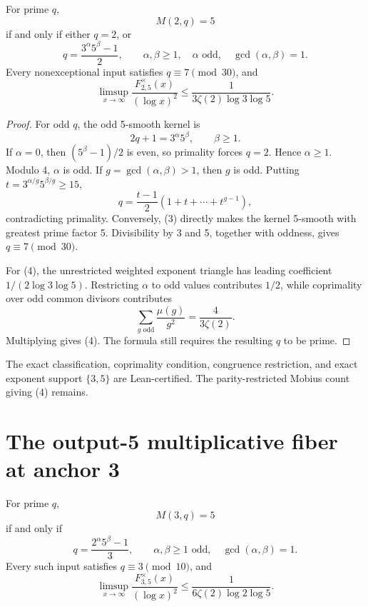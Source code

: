 \documentclass[10pt,a4paper]{scrartcl}
\begin{document}
For prime $q$,
\[
M(2,q)=5
\]
if and only if either $q=2$, or
\begin{equation}
q=\frac{3^\alpha5^\beta-1}{2},\qquad \alpha,\beta\ge1,\quad \alpha\text{ odd},\quad \gcd(\alpha,\beta)=1. \tag{3}
\end{equation}
Every nonexceptional input satisfies $q\equiv7\pmod{30}$, and
\begin{equation}
\limsup_{x\to\infty}\frac{F^\times_{2,5}(x)}{(\log x)^2}
\le\frac1{3\zeta(2)\log3\log5}. \tag{4}
\end{equation}

\begin{proof}
For odd $q$, the odd 5-smooth kernel is
\[
2q+1=3^\alpha5^\beta,\qquad \beta\ge1.
\]
If $\alpha=0$, then $(5^\beta-1)/2$ is even, so primality forces $q=2$. Hence $\alpha\ge1$. Modulo 4, $\alpha$ is odd. If $g=\gcd(\alpha,\beta)>1$, then $g$ is odd. Putting $t=3^{\alpha/g}5^{\beta/g}\ge15$,
\[
q=\frac{t-1}{2}(1+t+\cdots+t^{g-1}),
\]
contradicting primality. Conversely, (3) directly makes the kernel 5-smooth with greatest prime factor 5. Divisibility by 3 and 5, together with oddness, gives $q\equiv7\pmod{30}$.

For (4), the unrestricted weighted exponent triangle has leading coefficient $1/(2\log3\log5)$. Restricting $\alpha$ to odd values contributes $1/2$, while coprimality over odd common divisors contributes
\[
\sum_{g\text{ odd}}\frac{\mu(g)}{g^2}=\frac4{3\zeta(2)}.
\]
Multiplying gives (4). The formula still requires the resulting $q$ to be prime.
\end{proof}

The exact classification, coprimality condition, congruence restriction, and exact exponent support $\{3,5\}$ are Lean-certified. The parity-restricted Mobius count giving (4) remains.

\section{The output-5 multiplicative fiber at anchor 3}

For prime $q$,
\[
M(3,q)=5
\]
if and only if
\begin{equation}
q=\frac{2^\alpha5^\beta-1}{3},\qquad
\alpha,\beta\ge1\text{ odd},\quad \gcd(\alpha,\beta)=1. \tag{5}
\end{equation}
Every such input satisfies $q\equiv3\pmod{10}$, and
\begin{equation}
\limsup_{x\to\infty}\frac{F^\times_{3,5}(x)}{(\log x)^2}
\le\frac1{6\zeta(2)\log2\log5}. \tag{6}
\end{equation}
\end{document}
